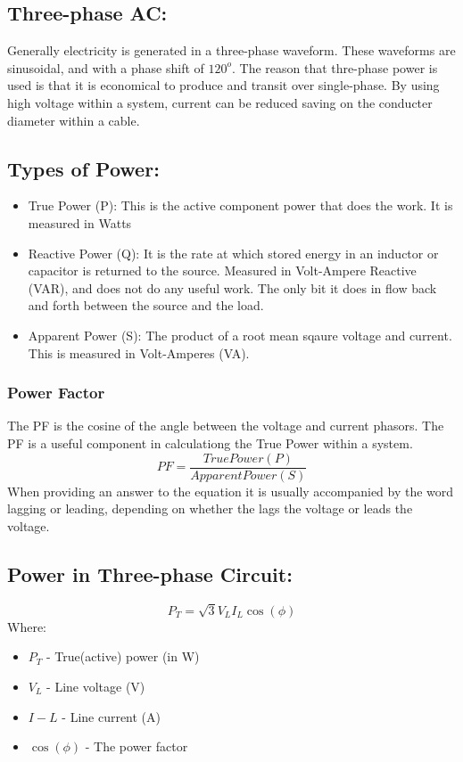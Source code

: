\documentclass[a5paper]{report}
\begin{document}
	\subsection*{Three-phase AC:}
	Generally electricity is generated in a three-phase waveform. These waveforms are sinusoidal, and with a phase shift of $120^{o}$. The reason that thre-phase power is used is that it is economical to produce and transit over single-phase. By using high voltage within a system, current can be reduced saving on the conducter diameter within a cable.

	\subsection*{Types of Power:}
	\begin{itemize}
		\item True Power (P): This is the active component power that does the work. It is measured in Watts
		\item Reactive Power (Q): It is the rate at which stored energy in an inductor or capacitor is returned to the source. Measured in Volt-Ampere Reactive (VAR), and does not do any useful work. The only bit it does in flow back and forth between the source and the load.
		\item Apparent Power (S): The product of a root mean sqaure voltage and current. This is measured in Volt-Amperes (VA).
	\end{itemize}
	\subsubsection*{Power Factor}
	The PF is the cosine of the angle between the voltage and current phasors. The PF is a useful component in calculationg the True Power within a system. 
	$$PF=\frac{True Power(P)}{Apparent Power(S)}$$
	When providing an answer to the equation it is usually accompanied by the word lagging or leading, depending on whether the lags the voltage or leads the voltage.

	\subsection*{Power in Three-phase Circuit:}
	$$P_{T}=\sqrt{3}V_{L}I_{L}\cos(\phi)$$
	Where:
	\begin{itemize}
		\item $P_{T}$ - True(active) power (in W)
		\item $V_{L}$ - Line voltage (V)
		\item $I-{L}$ - Line current (A)
		\item $\cos(\phi)$ - The power factor
	\end{itemize}
\end{document}
